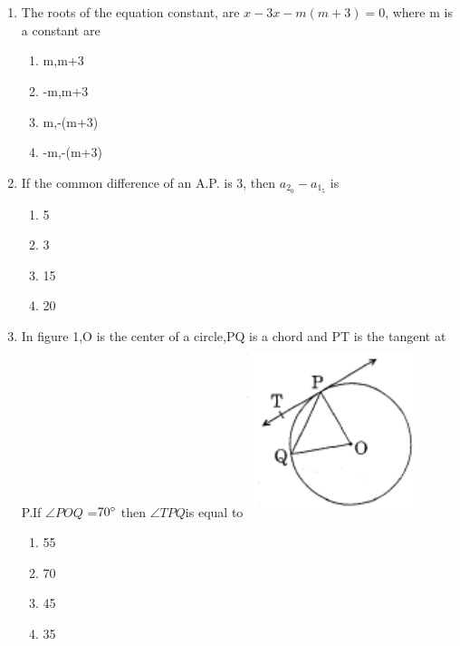 \documentclass[journal,12pt,twocolumn]{IEEEtran}
\renewcommand\thesection{\arabic{section}}
\begin{document}
\section{}
\renewcommand{\theequation}{\theenumi}
\begin{enumerate}[label=\thesection.\arabic*.,ref=\thesection.\theenumi]
\item The roots of the equation constant, are $x - 3x - m (m + 3) = 0$, where m is a constant are\\
\begin{enumerate}
    \item m,m+3
    \item -m,m+3
    \item m,-(m+3)
    \item -m,-(m+3)
\end{enumerate}
\item If the common difference of an A.P. is 3, then $a_2_0 -a_1_5$ is
\begin{enumerate}[A]
    \item 5
    \item 3
    \item 15
    \item 20
\end{enumerate}
\item In figure 1,O is the center of a circle,PQ is a chord and PT is the tangent at P.If $\angle POQ$ =$70\degree$ then $\angle TPQ $is equal to
\includegraphics[width = 5cm,height = 5cm,center]{3.png}
\begin{enumerate}
    \item 55\degree
    \item 70\degree
    \item 45\degree
    \item 35\degree
\end{enumerate}

\end{enumerate}
\end{document}
